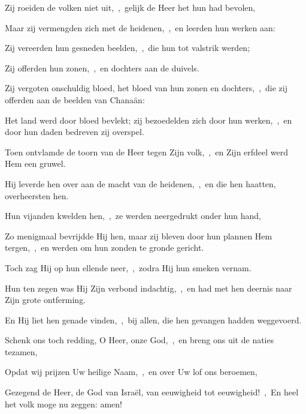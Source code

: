 \documentclass[12pt,twoside,a5paper]{article}
\begin{document}

\begin{halfparskip}
  Zij roeiden de volken niet uit,~\sep\ gelijk de Heer het hun had bevolen,

  Maar zij vermengden zich met de heidenen,~\sep\ en leerden hun werken aan:

  Zij vereerden hun gesneden beelden,~\sep\ die hun tot valstrik werden;

  Zij offerden hun zonen,~\sep\ en dochters aan de duivels.

  Zij vergoten onschuldig bloed, het bloed van hun zonen en dochters,~\sep\ die zij offerden aan de beelden van Chanaän:

  Het land werd door bloed bevlekt; zij bezoedelden zich door hun werken,~\sep\ en door hun daden bedreven zij overspel.

  Toen ontvlamde de toorn van de Heer tegen Zijn volk,~\sep\ en Zijn erfdeel werd Hem een gruwel.

  Hij leverde hen over aan de macht van de heidenen,~\sep\ en die hen haatten, overheersten hen.

  Hun vijanden kwelden hen,~\sep\ ze werden neergedrukt onder hun hand,
\end{halfparskip}


\begin{halfparskip}
  Zo menigmaal bevrijdde Hij hen, maar zij bleven door hun plannen Hem tergen,~\sep\ en werden om hun zonden te gronde gericht.

  Toch zag Hij op hun ellende neer,~\sep\ zodra Hij hun smeken vernam.

  Hun ten zegen was Hij Zijn verbond indachtig,~\sep\ en had met hen deernis naar Zijn grote ontferming.

  En Hij liet hen genade vinden,~\sep\ bij allen, die hen gevangen hadden weggevoerd.
\end{halfparskip}


\begin{halfparskip}
  Schenk ons toch redding, O Heer, onze God,~\sep\ en breng ons uit de naties tezamen,

  Opdat wij prijzen Uw heilige Naam,~\sep\ en over Uw lof ons beroemen,

  Gezegend de Heer, de God van Israël, van eeuwigheid tot eeuwigheid!~\sep\ En heel het volk moge nu zeggen: amen!
\end{halfparskip}
\end{document}
